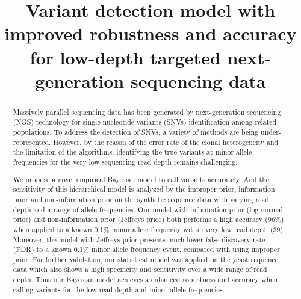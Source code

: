 \documentclass[11pt,reqno]{amsart}
\title[RVD3]{Variant detection model with improved robustness and accuracy for low-depth targeted next-generation sequencing data}
\author{}
\begin{document}
\begin{abstract}

Massively parallel sequencing data has been generated by next-generation sequencing (NGS) technology for single nucleotide variants (SNVs) identification among related populations. To address the detection of SNVs, a variety of methods are being under-represented. However, by the reason of the error rate of the clonal heterogeneity and the limitation of the algorithms, identifying the true variants at minor allele frequencies for the very low sequencing read depth remains challenging.

We propose a novel empirical Bayesian model to call variants accurately. And the sensitivity of this hierarchical model is analyzed by the improper prior, information prior and non-information prior on the synthetic sequence data with varying read depth and a range of allele frequencies. Our model with information prior (log-normal prior) and non-information prior (Jeffreys prior) both performs a high accuracy (96\%) when applied to a known 0.1\% minor allele frequency within very low read depth (39). Moreover, the model with Jeffreys prior presents much lower false discovery rate (FDR) to a known 0.1\% minor allele frequency event, compared with using improper prior. For further validation, our statistical model was applied on the yeast sequence data which also shows a high specificity and sensitivity over a wide range of read depth. Thus our Bayesian model achieves a enhanced robustness and accuracy when calling variants for the low read depth and minor allele frequencies.

\end{abstract}

\maketitle
\end{document}

